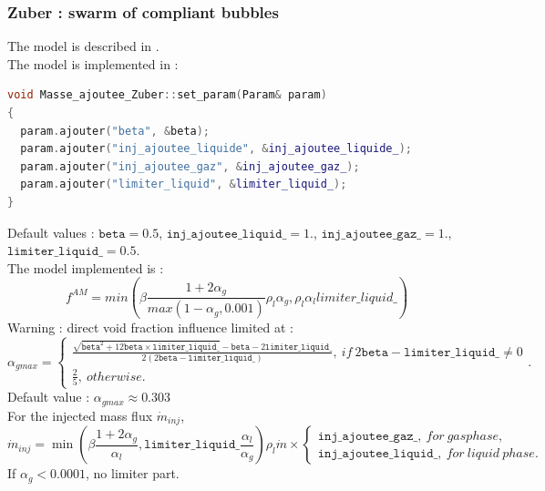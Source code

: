\subsubsection{Zuber : swarm of compliant bubbles}
The model is described in \textcite{ZUBER1964897}.\\
The model is implemented in :
\begin{lstlisting}[language=c++]
void Masse_ajoutee_Zuber::set_param(Param& param)
{
  param.ajouter("beta", &beta);
  param.ajouter("inj_ajoutee_liquide", &inj_ajoutee_liquide_);
  param.ajouter("inj_ajoutee_gaz", &inj_ajoutee_gaz_);
  param.ajouter("limiter_liquid", &limiter_liquid_);
}
\end{lstlisting}
Default values : $\texttt{beta}=0.5$, $\texttt{inj\_ajoutee\_liquid\_}=1.$, $\texttt{inj\_ajoutee\_gaz\_}=1.$, $\texttt{limiter\_liquid\_} = 0.5$.\\
The model implemented is :
\begin{equation}
   f^{AM}=min(\beta\frac{1+2\alpha_g}{max(1-\alpha_g,0.001)} \rho_l\alpha_g,\rho_l\alpha_l limiter\_liquid\_ )
\end{equation}
{\color{red} Warning} : direct void fraction influence limited at :
\begin{equation}
    \alpha_{gmax}=\begin{cases}
        \frac{\sqrt{\texttt{beta}^2+12\texttt{beta}\times \texttt{limiter\_liquid\_}}-\texttt{beta}-2\texttt{limiter\_liquid\_}}{2(2\texttt{beta}-\texttt{limiter\_liquid\_})},\ if\ 2\texttt{beta}-\texttt{limiter\_liquid\_}\neq 0 \\
        \frac{2}{5},\ otherwise.
    \end{cases}.
\end{equation}
Default value : $\alpha_{gmax}\approx 0.303$\\
For the injected mass flux $\dot{m}_{inj}$,
\begin{equation}
   \dot{m}_{inj}=\min(\beta\frac{1+2\alpha_g}{\alpha_l},\texttt{limiter\_liquid\_}\frac{\alpha_l}{\alpha_g}) \rho_l\dot{m}\times\begin{cases} \texttt{inj\_ajoutee\_gaz\_},\ for\ gas phase,\\ \texttt{inj\_ajoutee\_liquid\_},\ for\ liquid\ phase.
   \end{cases}
\end{equation}
If $\alpha_g< 0.0001$, no limiter part.\\

